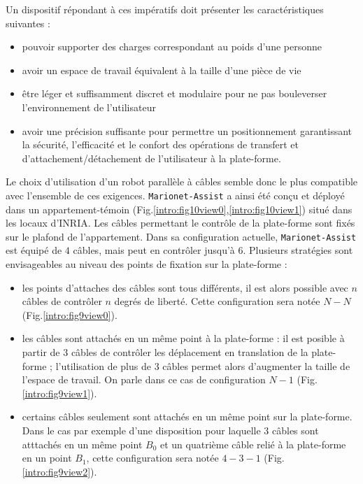 Un dispositif répondant à ces impératifs doit présenter les caractéristiques 
suivantes :
\begin{itemize}
 \item pouvoir supporter des charges correspondant au poids d'une personne
 \item avoir un espace de travail équivalent à la taille d'une pièce de vie
 \item être léger et suffisamment discret et modulaire pour ne pas bouleverser 
l'environnement de l'utilisateur
 \item avoir une précision suffisante pour permettre un positionnement 
garantissant la sécurité, l'efficacité et le confort des opérations de transfert 
et d'attachement/détachement de l'utilisateur à la plate-forme.
\end{itemize}

Le choix d'utilisation d'un robot parallèle à câbles semble donc le plus 
compatible avec l'ensemble de ces exigences. {\tt Marionet-Assist} a ainsi été 
conçu et déployé dans un appartement-témoin 
(Fig.\ref{intro:fig10view0},\ref{intro:fig10view1}) situé dans les locaux 
d'INRIA. Les câbles permettant le contrôle de la plate-forme sont fixés sur le 
plafond de l'appartement. Dans sa configuration actuelle, {\tt Marionet-Assist} 
est équipé de $4$ câbles, mais peut en contrôler jusqu'à $6$. Plusieurs 
stratégies sont envisageables au niveau des points de fixation sur la 
plate-forme :
\begin{itemize}
 \item les points d'attaches des câbles sont tous différents, il est alors 
possible avec $n$ câbles de contrôler $n$ degrés de liberté. Cette configuration 
sera notée $N-N$ (Fig.\ref{intro:fig9view0}).
 \item les câbles sont attachés en un même point à la plate-forme : il est 
posible à partir de $3$ câbles de contrôler les déplacement en translation de la 
plate-forme ; l'utilisation de plus de $3$ câbles permet alors d'augmenter la 
taille de l'espace de travail. On parle dans ce cas de configuration $N-1$ 
(Fig.\ref{intro:fig9view1}).
 \item certains câbles seulement sont attachés en un même point sur la 
plate-forme. Dans le cas par exemple d'une disposition pour laquelle $3$ câbles 
sont atttachés en un même point $B_0$ et un quatrième câble relié à la 
plate-forme en un point $B_1$, cette configuration sera notée $4-3-1$ 
(Fig.\ref{intro:fig9view2}).
\end{itemize}

